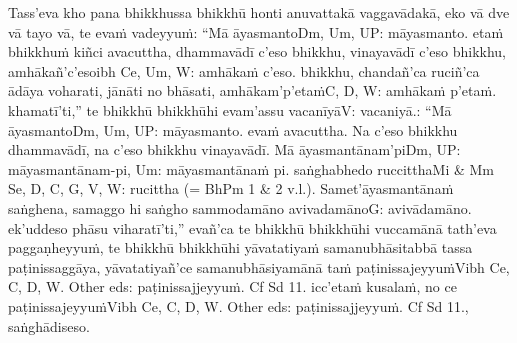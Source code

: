 Tass'eva kho pana bhikkhussa bhikkhū honti anuvattakā vaggavādakā, eko vā dve vā tayo vā, te evaṁ vadeyyuṁ: ``Mā āyasmanto\makeatletter\hyperlink{endnote-appendix}\makeatother Dm, Um, UP: māyasmanto. etaṁ bhikkhuṁ kiñci avacuttha, dhammavādī c'eso bhikkhu, vinayavādī c'eso bhikkhu, amhākañ'c'eso\makeatletter\hyperlink{endnote-appendix}\makeatother ibh Ce, Um, W: amhākaṁ c'eso. bhikkhu, chandañ'ca ruciñ'ca ādāya voharati, jānāti no bhāsati, amhākam'p'etaṁ\makeatletter\hyperlink{endnote-appendix}\makeatother C, D, W: amhākaṁ p'etaṁ. khamatī'ti,'' te bhikkhū bhikkhūhi evam'assu vacanīyā\makeatletter\hyperlink{endnote-appendix}\makeatother V: vacaniyā.: ``Mā āyasmanto\makeatletter\hyperlink{endnote-appendix}\makeatother Dm, Um, UP: māyasmanto. evaṁ avacuttha. Na c'eso bhikkhu dhammavādī, na c'eso bhikkhu vinayavādī. Mā āyasmantānam'pi\makeatletter\hyperlink{endnote-appendix}\makeatother Dm, UP: māyasmantānam-pi, Um: māyasmantānaṁ pi. saṅghabhedo ruccittha\makeatletter\hyperlink{endnote-appendix}\makeatother Mi & Mm Se, D, C, G, V, W: rucittha (= BhPm 1 & 2 v.l.). Samet'āyasmantānaṁ saṅghena, samaggo hi saṅgho sammodamāno avivadamāno\makeatletter\hyperlink{endnote-appendix}\makeatother G: avivādamāno. ek'uddeso phāsu viharatī'ti,'' evañ'ca te bhikkhū bhikkhūhi vuccamānā tath'eva paggaṇheyyuṁ, te bhikkhū bhikkhūhi yāvatatiyaṁ samanubhāsitabbā tassa paṭinissaggāya, yāvatatiyañ'ce samanubhāsiyamānā taṁ paṭinissajeyyuṁ\makeatletter\hyperlink{endnote-appendix}\makeatother Vibh Ce, C, D, W. Other eds: paṭinissajjeyyuṁ. Cf Sd 11. icc'etaṁ kusalaṁ, no ce paṭinissajeyyuṁ\makeatletter\hyperlink{endnote-appendix}\makeatother Vibh Ce, C, D, W. Other eds: paṭinissajjeyyuṁ. Cf Sd 11., saṅghādiseso.



